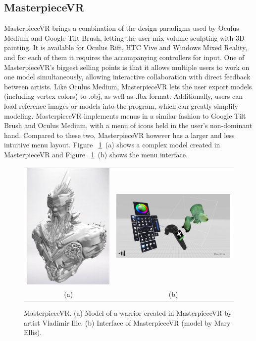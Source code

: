 \subsection{MasterpieceVR}
MasterpieceVR brings a combination of the design paradigms used by Oculus Medium and Google Tilt Brush, letting the user mix volume sculpting with 3D painting. It is available for Oculus Rift, HTC Vive and Windows Mixed Reality, and for each of them it requires the accompanying controllers for input. One of MasterpieceVR's biggest selling points is that it allows multiple users to work on one model simultaneously, allowing interactive collaboration with direct feedback between artists. Like Oculus Medium, MasterpieceVR lets the user export models (including vertex colors) to .obj, as well as .fbx format. Additionally, users can load reference images or models into the program, which can greatly simplify modeling. MasterpieceVR implements menus in a similar fashion to Google Tilt Brush and Oculus Medium, with a menu of icons held in the user's non-dominant hand. Compared to these two, MasterpieceVR however has a larger and less intuitive menu layout. Figure ~\ref{fig:masterpieceVR}~(a) shows a complex model created in MasterpieceVR and Figure ~\ref{fig:masterpieceVR}~(b) shows the menu interface.

\begin{figure}[!h]
    \centering
    \setlength{\tabcolsep}{0.0130\linewidth}
    \begin{tabular}{@{}cc@{}}
   	\includegraphics[width=0.35\linewidth]{figures/MasterpieceVR_Vladimir_Ilic}&
   	\includegraphics[width=0.5\linewidth]{figures/MasterpieceVR_interface}\\
    (a)&(b)\\
    \end{tabular}
    \caption[MasterpieceVR]{MasterpieceVR.
    	  \textup{(a)} Model of a warrior created in MasterpieceVR by artist Vladimir Ilic.
			  \textup{(b)} Interface of MasterpieceVR (model by Mary Ellis). 
      \label{fig:masterpieceVR}}
\end{figure}

